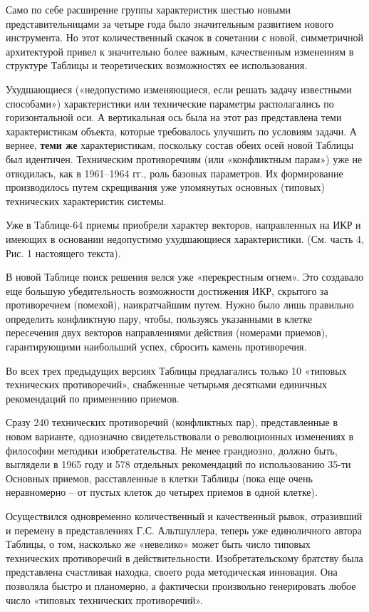 \documentclass[11pt,a4paper]{article}
\begin{document}
Само по себе расширение группы характеристик шестью новыми представительницами
за четыре года было значительным развитием нового инструмента. Но этот
количественный скачок в сочетании с новой, симметричной архитектурой привел к
значительно более важным, качественным изменениям в структуре Таблицы и
теоретических возможностях ее использования.

Ухудшающиеся («недопустимо изменяющиеся, если решать задачу известными
способами») характеристики или технические параметры располагались по
горизонтальной оси. А вертикальная ось была на этот раз представлена теми
характеристикам объекта, которые требовалось улучшить по условиям задачи. А
вернее, \textbf{теми же} характеристикам, поскольку состав обеих осей новой
Таблицы был идентичен. Техническим противоречиям (или «конфликтным парам») уже
не отводилась, как в 1961--1964 гг., роль базовых параметров. Их формирование
производилось путем скрещивания уже упомянутых основных (типовых) технических
характеристик системы.

Уже в Таблице-64 приемы приобрели характер векторов, направленных на ИКР и
имеющих в основании недопустимо ухудшающиеся характеристики. (См. часть 4,
Рис. 1 настоящего текста).

В новой Таблице поиск решения велся уже «перекрестным огнем». Это создавало
еще большую убедительность возможности достижения ИКР, скрытого за
противоречием (помехой), наикратчайшим путем. Нужно было лишь правильно
определить конфликтную пару, чтобы, пользуясь указанными в клетке пересечения
двух векторов направлениями действия (номерами приемов), гарантирующими
наибольший успех, сбросить камень противоречия.

Во всех трех предыдущих версиях Таблицы предлагались только 10 «типовых
технических противоречий», снабженные четырьмя десятками единичных
рекомендаций по применению приемов.

Сразу 240 технических противоречий (конфликтных пар), представленные в новом
варианте, однозначно свидетельствовали о революционных изменениях в философии
методики изобретательства. Не менее грандиозно, должно быть, выглядели в 1965
году и 578 отдельных рекомендаций по использованию 35-ти Основных приемов,
расставленные в клетки Таблицы (пока еще очень неравномерно -- от пустых
клеток до четырех приемов в одной клетке).

Осуществился одновременно количественный и качественный рывок, отразивший и
перемену в представлениях Г.С. Альтшуллера, теперь уже единоличного автора
Таблицы, о том, насколько же «невелико» может быть число типовых технических
противоречий в действительности. Изобретательскому братству была представлена
счастливая находка, своего рода методическая инновация. Она позволяла быстро и
планомерно, а фактически произвольно генерировать любое число «типовых
технических противоречий».
\end{document}
